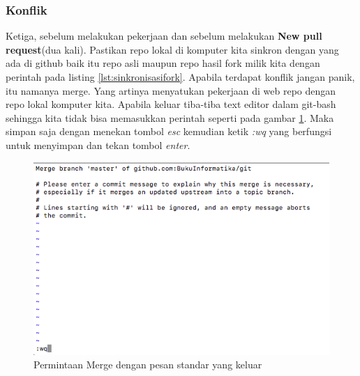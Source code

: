 \subsubsection{Konflik}
Ketiga, sebelum melakukan pekerjaan dan sebelum melakukan \textbf{New pull request}(dua kali). Pastikan repo lokal di komputer kita sinkron dengan yang ada di github baik itu repo asli maupun repo hasil fork milik kita dengan perintah pada listing \ref{lst:sinkronisasifork}. Apabila terdapat konflik jangan panik, itu namanya merge. Yang artinya menyatukan pekerjaan di web repo dengan repo lokal komputer kita. Apabila keluar tiba-tiba text editor dalam git-bash sehingga kita tidak bisa memasukkan perintah seperti pada gambar \ref{mergepull}. Maka simpan saja dengan menekan tombol \textit{esc} kemudian ketik \textit{:wq} yang berfungsi untuk menyimpan dan tekan tombol \textit{enter}.



\begin{figure}[!htbp]
\centerline{\includegraphics[width=.75\textwidth]{Figures/mergepull}}
\caption{Permintaan Merge dengan pesan standar yang keluar}
\label{mergepull}
\end{figure}
